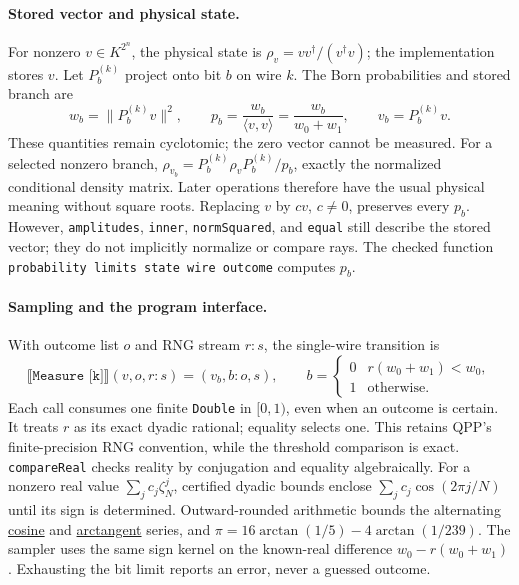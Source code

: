 \documentclass[11pt,a4paper]{article}
\newcommand{\sem}[1]{\llbracket #1\rrbracket}
\newcommand{\code}[1]{\texttt{#1}}
\begin{document}
\paragraph{Stored vector and physical state.}
For nonzero $v\in K^{2^n}$, the physical state is $\rho_v=vv^\dagger/(v^\dagger v)$;
the implementation stores $v$. Let $P_b^{(k)}$ project onto bit $b$ on wire $k$.
The Born probabilities and stored branch are
\begin{equation}
 w_b=\|P_b^{(k)}v\|^2,\qquad
 p_b=\frac{w_b}{\langle v,v\rangle}=\frac{w_b}{w_0+w_1},\qquad v_b=P_b^{(k)}v.
 \label{eq:measurement}
\end{equation}
These quantities remain cyclotomic; the zero vector cannot be measured.
For a selected nonzero branch,
$\rho_{v_b}=P_b^{(k)}\rho_vP_b^{(k)}/p_b$, exactly the normalized conditional
density matrix. Later operations therefore have the usual physical meaning
without square roots. Replacing $v$ by $cv$, $c\ne0$, preserves every $p_b$.
However, \code{amplitudes}, \code{inner},
\code{normSquared}, and \code{equal} still describe the stored vector;
they do not implicitly normalize or compare rays. The checked function
\code{probability limits state wire outcome} computes $p_b$.

\paragraph{Sampling and the program interface.}
With outcome list $o$ and RNG stream $r:s$, the single-wire transition is
\[
 \sem{\code{Measure [k]}}(v,o,r:s)=(v_b,b:o,s),\qquad
 b=\begin{cases}0&r(w_0+w_1)<w_0,\\1&\text{otherwise}.\end{cases}
\]
Each call consumes one finite \code{Double} in $[0,1)$, even when an outcome
is certain. It treats $r$ as its exact dyadic rational; equality selects one.
This retains QPP's finite-precision RNG convention, while the threshold
comparison is exact. \code{compareReal} checks reality by conjugation and
equality algebraically. For a nonzero real value
$\sum_j c_j\zeta_N^j$, certified dyadic bounds enclose
$\sum_j c_j\cos(2\pi j/N)$ until its sign is determined.
Outward-rounded arithmetic bounds the alternating
\href{https://dlmf.nist.gov/4.19#E2}{cosine} and
\href{https://dlmf.nist.gov/4.24#E3}{arctangent} series, and
$\pi=16\arctan(1/5)-4\arctan(1/239)$. The sampler uses the same sign kernel
on the known-real difference $w_0-r(w_0+w_1)$.
Exhausting the bit limit reports an error, never a guessed outcome.
\end{document}
